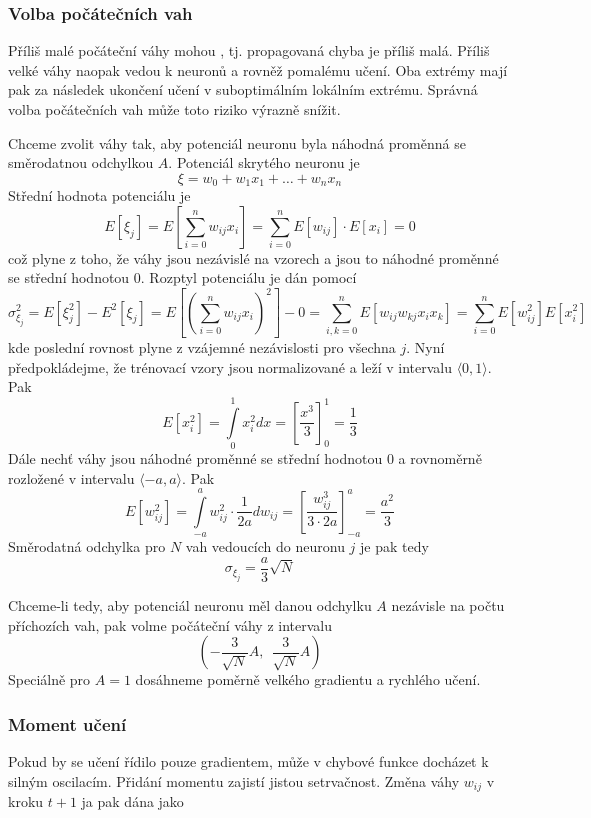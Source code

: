 \documentclass[11pt]{report} %
\numberwithin{equation}{section}
\begin{document}
\subsubsection{Volba počátečních vah}
Příliš malé počáteční váhy mohou , tj. propagovaná chyba je příliš malá. Příliš velké váhy naopak vedou k  neuronů a rovněž pomalému učení. Oba extrémy mají pak za následek ukončení učení v suboptimálním lokálním extrému. Správná volba počátečních vah může toto riziko výrazně snížit.

Chceme zvolit váhy tak, aby potenciál neuronu byla náhodná proměnná se směrodatnou odchylkou $A$. Potenciál skrytého neuronu je
$$\xi = w_0 + w_1x_1 + \dots + w_nx_n$$
Střední hodnota potenciálu je 
$$E[\xi_j] = E\left[\sum\limits_{i=0}^{n}w_{ij} x_i  \right] = \sum\limits_{i=0}^{n} E[w_{ij}] \cdot E[x_i] = 0$$
což plyne z toho, že váhy jsou nezávislé na vzorech a jsou to náhodné proměnné se  střední hodnotou 0. Rozptyl potenciálu je dán pomocí
$$\sigma_{\xi_j}^2 = E[\xi_j^2] - E^2[\xi_j] = E\left[\left(\sum\limits_{i=0}^{n} w_{ij}x_i \right)^2 \right] -0 = \sum\limits_{i,k = 0}^{n} E[w_{ij}w_{kj} x_{i} x_{k}] = \sum\limits_{i = 0}^{n} E[w_{ij}^2] E[x_{i}^2]$$
kde poslední rovnost plyne z vzájemné nezávislosti pro všechna $j$. Nyní předpokládejme, že trénovací vzory jsou normalizované a leží v intervalu $\langle 0,1 \rangle$. Pak
$$E[x_i^2] = \int\limits_0^1 x_i^2 dx = \left[\frac{x^3}{3} \right]_0^1 = \frac{1}{3}$$
Dále nechť váhy jsou náhodné proměnné se střední hodnotou 0 a rovnoměrně rozložené v intervalu $\langle -a, a \rangle$. Pak
$$E[w_{ij}^2] = \int\limits_{-a}^a w_{ij}^2 \cdot \frac{1}{2a} dw_{ij} = \left[\frac{w_{ij}^3}{3\cdot 2a}\right]_{-a}^a = \frac{a^2}{3}$$
Směrodatná odchylka pro $N$ vah vedoucích do neuronu $j$ je pak tedy
$$\sigma_{\xi_j} = \frac{a}{3}\sqrt{N}$$

Chceme-li tedy, aby potenciál neuronu měl danou odchylku $A$ nezávisle na počtu příchozích vah, pak volme počáteční váhy z intervalu
$$\left(- \frac{3}{\sqrt{N}} A,\ \ \frac{3}{\sqrt{N}} A \right)$$
Speciálně pro $A = 1$ dosáhneme poměrně velkého gradientu a rychlého učení.

\subsubsection{Moment učení}
Pokud by se učení řídilo pouze gradientem, může v  chybové funkce docházet k silným oscilacím. Přidání momentu zajistí jistou setrvačnost. Změna váhy $w_{ij}$ v kroku $t+1$ ja pak dána jako
\end{document}
